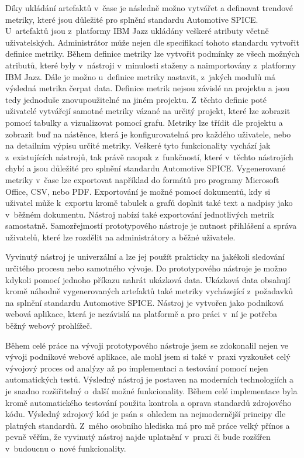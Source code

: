 \documentclass[czech,master]{diploma}
\begin{document}
Díky ukládání artefaktů v~čase je následně možno vytvářet a definovat trendové metriky, které jsou důležité pro splnění standardu Automotive SPICE. U~artefaktů jsou z~platformy IBM Jazz ukládány veškeré atributy včetně uživatelských. Administrátor může nejen dle specifikací tohoto standardu vytvořit definice metriky. Během definice metriky lze vytvořit podmínky ze všech možných atributů, které byly v~nástroji v~minulosti staženy a naimportovány z~platformy IBM Jazz. Dále je možno u~definice metriky nastavit, z~jakých modulů má výsledná metrika čerpat data. Definice metrik nejsou závislé na projektu a jsou tedy jednoduše znovupoužitelné na jiném projektu. Z~těchto definic poté uživatelé vytvářejí samotné metriky vázané na určitý projekt, které lze zobrazit pomocí tabulky a vizualizovat pomocí grafu. Metriky lze třídit dle projektu a zobrazit buď na nástěnce, která je konfigurovatelná pro každého uživatele, nebo na detailním výpisu určité metriky. Veškeré tyto funkcionality vychází jak z~existujících nástrojů, tak právě naopak z~funkčností, které v~těchto nástrojích chybí a jsou důležité pro splnění standardu Automotive SPICE. Vygenerované metriky v~čase lze exportovat například do formátů pro programy Microsoft Office, CSV, nebo PDF. Exportování je možné pomocí dokumentů, kdy si uživatel může k~exportu kromě tabulek a grafů doplnit také text a nadpisy jako v~běžném dokumentu. Nástroj nabízí také exportování jednotlivých metrik samostatně. Samozřejmostí prototypového nástroje je nutnost přihlášení a správa uživatelů, které lze rozdělit na administrátory a běžné uživatele.

Vyvinutý nástroj je univerzální a lze jej použít prakticky na jakékoli sledování určitého procesu nebo samotného vývoje. Do prototypového nástroje je možno kdykoli pomocí jednoho příkazu nahrát ukázková data. Ukázková data obsahují kromě náhodně vygenerovaných artefaktů také metriky vycházející z~požadavků na splnění standardu Automotive SPICE. Nástroj je vytvořen jako podniková webová aplikace, která je nezávislá na platformě a pro práci v~ní je potřeba běžný webový prohlížeč.

Během celé práce na vývoji prototypového nástroje jsem se zdokonalil nejen ve vývoji podnikové webové aplikace, ale mohl jsem si také v~praxi vyzkoušet celý vývojový proces od analýzy až po implementaci a testování pomocí nejen automatických testů. Výsledný nástroj je postaven na moderních technologiích a je snadno rozšiřitelný o~další možné funkcionality. Během celé implementace byla kromě automatického testování použita kontrola a oprava standardů zdrojového kódu. Výsledný zdrojový kód je psán s~ohledem na nejmodernější principy dle platných standardů. Z~mého osobního hlediska má pro mě práce velký přínos a pevně věřím, že vyvinutý nástroj najde uplatnění v~praxi či bude rozšířen v~budoucnu o~nové funkcionality.
\end{document}
